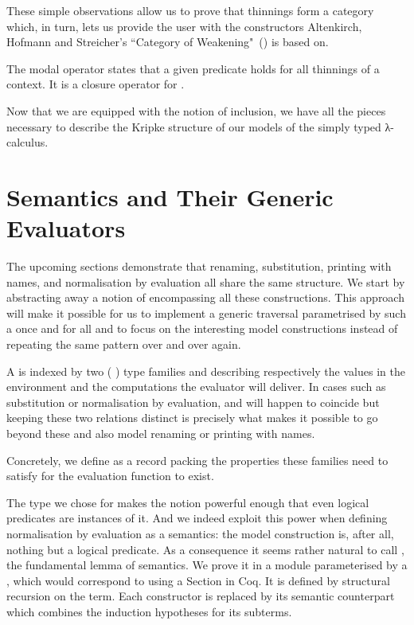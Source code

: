 These simple observations allow us to prove that thinnings
form a category which, in turn, lets us provide the user with the
constructors Altenkirch, Hofmann and Streicher's ``Category of
Weakening"~(\citeyear{altenkirch1995categorical}) is based on.

The modal operator  states that a given predicate holds for
all thinnings of a context. It is a closure operator for .

Now that we are equipped with the notion of inclusion, we have all
the pieces necessary to describe the Kripke structure of our models
of the simply typed λ-calculus.

\section{Semantics and Their Generic Evaluators}

The upcoming sections demonstrate that renaming, substitution, printing with names,
and normalisation by evaluation all share the same structure. We start by abstracting
away a notion of  encompassing all these constructions. This approach
will make it possible for us to implement a generic traversal parametrised by such
a  once and for all and to focus on the interesting model constructions
instead of repeating the same pattern over and over again.

A  is indexed by two ( ) type families
 and  describing respectively the values in the environment
and the computations the evaluator will deliver. In cases such as substitution
or normalisation by evaluation,  and  will happen to coincide but
keeping these two relations distinct is precisely what makes it possible to go
beyond these and also model renaming or printing with names.

Concretely, we define  as a record packing the properties these
families need to satisfy for the evaluation function to exist.


The type we chose for  makes the  notion
powerful enough that even logical predicates are instances of it. And we
indeed exploit this power when defining normalisation by evaluation
as a semantics: the model construction is, after all, nothing but a logical
predicate. As a consequence it seems rather natural to call , the
fundamental lemma of semantics. We prove it in a module parameterised by a
, which would correspond to using a Section in Coq. It is
defined by structural recursion on the term. Each constructor is replaced
by its semantic counterpart which combines the induction hypotheses
for its subterms.

